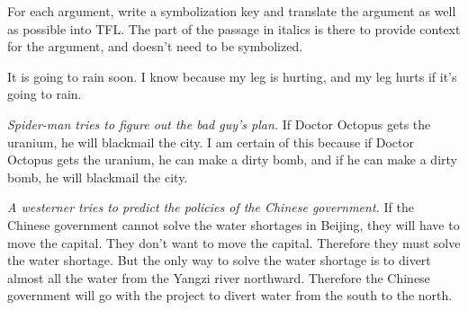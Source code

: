 \setcounter{ProbPart}{8} %
\problempart
For each argument, write a symbolization key and translate the argument as well as possible into TFL. The part of the passage in italics is there to provide context for the argument, and doesn't need to be symbolized.
\begin{earg}
\item It is going to rain soon. I know because my leg is hurting, and my leg hurts if it's going to rain. 



\item  \emph{Spider-man tries to figure out the bad guy's plan.} If Doctor Octopus gets the uranium, he will blackmail the city. I am certain of this because if Doctor Octopus gets the uranium, he can make a dirty bomb, and if he can make a dirty bomb, he will blackmail the city.



\item \emph{A westerner tries to predict the policies of the Chinese government.} If the Chinese government cannot solve the water shortages in Beijing, they will have to move the capital. They don't want to move the capital. Therefore they must solve the water shortage. But the only way to solve the water shortage is to divert almost all the water from the Yangzi river northward. Therefore the Chinese government will go with the project to divert water from the south to the north.       





\end{earg}

